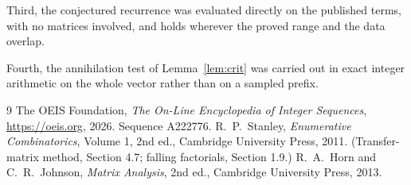 \documentclass[11pt,a4paper]{article}
\theoremstyle{plain}
\theoremstyle{definition}
\begin{document}
Third, the conjectured recurrence was evaluated directly on the published terms, with no
matrices involved, and holds wherever the proved range and the data overlap.

Fourth, the annihilation test of Lemma~\ref{lem:crit} was carried out in exact integer
arithmetic on the whole vector rather than on a sampled prefix.

\begin{thebibliography}{9}
 The OEIS Foundation, \emph{The On-Line Encyclopedia of Integer
Sequences}, \url{https://oeis.org}, 2026. Sequence A222776.
 R.~P.~Stanley, \emph{Enumerative Combinatorics}, Volume 1, 2nd ed.,
Cambridge University Press, 2011. (Transfer-matrix method, Section 4.7; falling factorials,
Section 1.9.)
 R.~A.~Horn and C.~R.~Johnson, \emph{Matrix Analysis}, 2nd ed., Cambridge
University Press, 2013.
\end{thebibliography}
\end{document}
